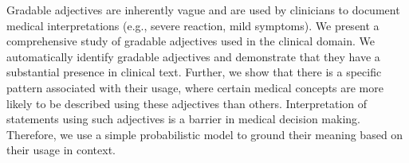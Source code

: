 Gradable adjectives are inherently vague and are used by clinicians to document medical interpretations (e.g., severe reaction, mild symptoms). We present a comprehensive study of gradable adjectives used in the clinical domain. We automatically identify gradable adjectives and demonstrate that they have a substantial presence in clinical text. Further, we show that there is a specific pattern associated with their usage, where certain medical concepts are more likely to be described using these adjectives than others. Interpretation of statements using such adjectives is a barrier in medical decision making. Therefore, we use a simple probabilistic model to ground their meaning based on their usage in context.
